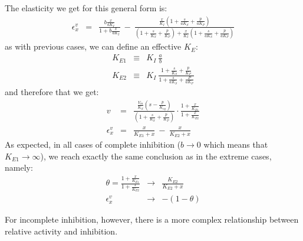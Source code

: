 \documentclass[12pt,a4paper]{article}
\begin{document}
The elasticity we get for this general form is:
\begin{eqnarray}
\epsilon_x^v &=& \frac{b \frac{x}{aK_I}}{1 + b \frac{x}{aK_I}} ~-~ \frac{\frac{x}{K_I} \left(1 + \frac{s}{aK_S} + \frac{p}{aK_P}\right)}{\left(1 + \frac{s}{K_S} + \frac{p}{K_P}\right) + \frac{x}{K_I} \left(1 + \frac{s}{aK_S} + \frac{p}{aK_P}\right)}
\end{eqnarray}
as with previous cases, we can define an effective $K_E$:
\begin{eqnarray}
    K_{E1} & \equiv & K_I ~ \frac{a}{b} \\
    K_{E2} & \equiv & K_I ~ \frac{1 + \frac{s}{K_S} + \frac{p}{K_P}}{1 + \frac{s}{aK_S} + \frac{P}{aK_P}}
\end{eqnarray}
and therefore that we get:
\begin{eqnarray}
v &=& \frac{\frac{V_m}{K_S}\left(s - \frac{p}{K_{eq}}\right)}{\left(1 + \frac{s}{K_S} + \frac{p}{K_P}\right)} \cdot \frac{1 + \frac{x}{K_{E1}}}{1 + \frac{x}{K_{E2}}} \nonumber \\
\epsilon_x^v &=& \frac{x}{K_{E1} + x} ~-~ \frac{x}{K_{E2} + x}
\end{eqnarray}
As expected, in all cases of complete inhibition ($b \rightarrow 0$ which means that $K_{E1} \rightarrow \infty$), we reach exactly the same conclusion as in the extreme cases, namely:
\begin{eqnarray}
\theta = \frac{1 + \frac{x}{K_{E1}}}{1 + \frac{x}{K_{E2}}} &\rightarrow& \frac{K_{E2}}{K_{E2} + x} \nonumber\\
\epsilon_x^v &\rightarrow& -(1 - \theta) \label{eq:eps_general_inh}
\end{eqnarray}

For incomplete inhibition, however, there is a more complex relationship between relative activity and inhibition.
\end{document}
